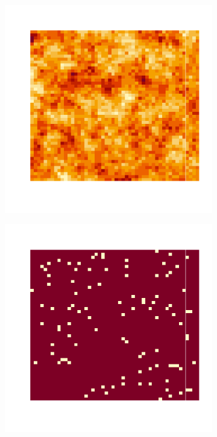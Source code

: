 \documentclass[10pt]{article} %
\begin{document}
\begin{figure}[h!]
    \centering
    \begin{subfigure}[b]{0.3\textwidth}
        \centering
        \includegraphics[width=\textwidth]{media/gauss_champ_1.png}
        \label{gauss plasma}
    \end{subfigure}
    \hfill
    \begin{subfigure}[b]{0.3\textwidth}
        \centering
        \includegraphics[width=\textwidth]{media/gauss_sites_1.png}

\end{subfigure}
\end{figure}
\end{document}
